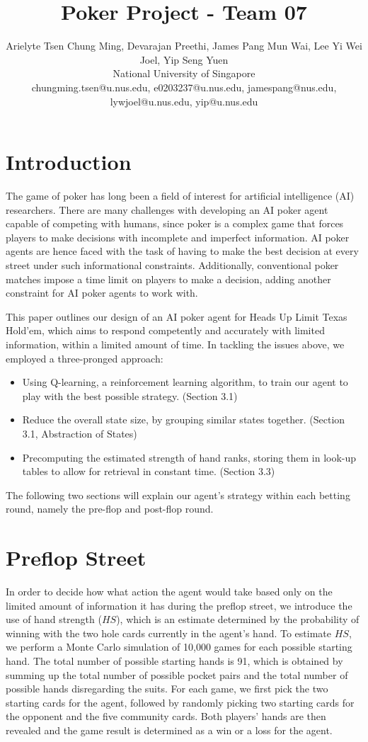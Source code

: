 \documentclass{article}
\title{Poker Project - Team 07}
\author{
Arielyte Tsen Chung Ming, Devarajan Preethi, James Pang Mun Wai, Lee Yi Wei Joel, Yip Seng Yuen
\\ 
National University of Singapore\\
%
chungming.tsen@u.nus.edu, e0203237@u.nus.edu, jamespang@nus.edu, lywjoel@u.nus.edu, yip@u.nus.edu
}
\begin{document}
\maketitle

\section{Introduction}

The game of poker has long been a field of interest for artificial intelligence (AI) researchers. There are many challenges with developing an AI poker agent capable of competing with humans, since poker is a complex game that forces players to make decisions with incomplete and imperfect information. AI poker agents are hence faced with the task of having to make the best decision at every street under such informational constraints. Additionally, conventional poker matches impose a time limit on players to make a decision, adding another constraint for AI poker agents to work with.

This paper outlines our design of an AI poker agent for Heads Up Limit Texas Hold’em, which aims to respond competently and accurately with limited information, within a limited amount of time. In tackling the issues above, we employed a three-pronged approach:

\begin{itemize}
  \item Using Q-learning, a reinforcement learning algorithm, to train our agent to play with the best possible strategy. (Section 3.1)
  \item Reduce the overall state size, by grouping similar states together. (Section 3.1, Abstraction of States)
  \item Precomputing the estimated strength of hand ranks, storing them in look-up tables to allow for retrieval in constant time. (Section 3.3)
 \end{itemize}

The following two sections will explain our agent’s strategy within each betting round, namely the pre-flop and post-flop round.
\section{Preflop Street}

In order to decide how what action the agent would take based only on the limited amount of information it has during the preflop street, we introduce the use of hand strength ($HS$), which is an estimate determined by the probability of winning with the two hole cards currently in the agent’s hand.
To estimate $HS$, we perform a Monte Carlo simulation of 10,000 games for each possible starting hand. The total number of possible starting hands is 91, which is obtained by summing up the total number of possible pocket pairs and the total number of possible hands disregarding the suits. For each game, we first pick the two starting cards for the agent, followed by randomly picking two starting cards for the opponent and the five community cards. Both players’ hands are then revealed and the game result is determined as a win or a loss for the agent.
\end{document}
